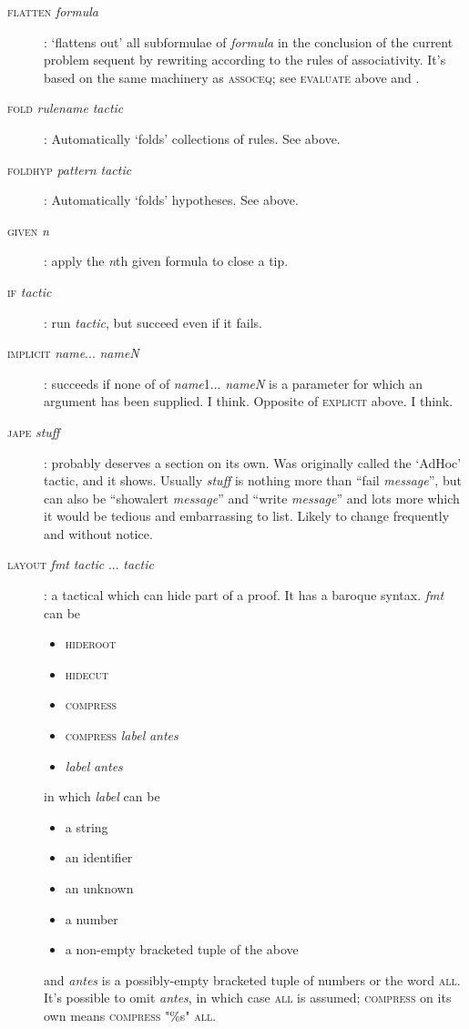 \begin{description}
\item [\textsc{flatten} \textit{formula}]: `flattens out' all subformulae of \textit{formula} in the conclusion of the current problem sequent by rewriting according to the rules of associativity. It's based on the same machinery as \textsc{assoceq}; see \textsc{evaluate} above and .


\item [\textsc{fold} \textit{rulename} \textit{tactic}]: Automatically `folds' collections of rules. See  above.
\item [\textsc{foldhyp} \textit{pattern tactic}]: Automatically `folds' hypotheses. See  above.

\item [\textsc{given} \textit{n}]: apply the \textit{n}th given formula to close a tip.

\item [\textsc{if} \textit{tactic}]: run \textit{tactic}, but succeed even if it fails.


\item [\textsc{implicit} \textit{name}... \textit{nameN}]: succeeds if none of of \textit{name}1... \textit{nameN} is a parameter for which an argument has been supplied. I think. Opposite of \textsc{explicit} above. I think.


\item [\textsc{jape} \textit{stuff} ]: probably deserves a section on its own. Was originally called the `AdHoc' tactic, and it shows. Usually \textit{stuff} is nothing more than ``fail \textit{message}'', but can also be ``showalert \textit{message}'' and ``write \textit{message}'' and lots more which it would be tedious and embarrassing to list. Likely to change frequently and without notice.


\item [\textsc{layout} \textit{fmt} \textit{tactic} ... \textit{tactic}]: a tactical which can hide part of a proof. It has a baroque syntax. \textit{fmt} can be 
\begin{itemize}
\item \textsc{hideroot}
\item \textsc{hidecut} 
\item \textsc{compress}
\item \textsc{compress} \textit{label} \textit{antes}
\item \textit{label} \textit{antes}
\end{itemize}
in which \textit{label} can be \begin{itemize}
\item a string
\item an identifier
\item an unknown
\item a number 
\item a non-empty bracketed tuple of the above
\end{itemize}
and \textit{antes} is a possibly-empty bracketed tuple of numbers or the word \textsc{all}. It's possible to omit \textit{antes}, in which case \textsc{all} is assumed; \textsc{compress} on its own means \textsc{compress} "\%s" \textsc{all}.


\end{description}
